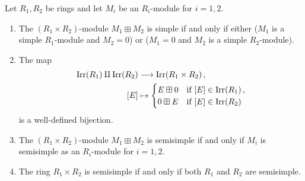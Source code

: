 \begin{proposition}
  \label{proposition: product of semisimple}
  Let $R_1, R_2$ be rings and let $M_i$ be an $R_i$-module for $i = 1, 2$.
  \begin{enumerate}
    \item
      \label{enumerate: when boxplus is simple}
      The $(R_1 \times R_2)$-module $M_1 \boxplus M_2$ is simple if and only if either ($M_1$ is a simple $R_1$-module and $M_2 = 0$) or ($M_1 = 0$ and $M_2$ is a simple $R_2$-module).
    \item
      The map
      \begin{align*}
                  \operatorname{Irr}(R_1) \amalg \operatorname{Irr}(R_2)
        &\longrightarrow  \operatorname{Irr}(R_1 \times R_2) \,,
        \\
                  [E]
        &\mapsto  \begin{cases}
                    E \boxplus 0  & \text{if $[E] \in \operatorname{Irr}(R_1)$} \,, \\
                    0 \boxplus E  & \text{if $[E] \in \operatorname{Irr}(R_2)$}
                  \end{cases}
      \end{align*}
      is a well-defined bijection.
    \item
      \label{enumerate: when boxplus is semisimple}
      The $(R_1 \times R_2)$-module $M_1 \boxplus M_2$ is semisimple if and only if $M_i$ is semisimple as an $R_i$-module for $i = 1, 2$.
    \item
      The ring $R_1 \times R_2$ is semisimple if and only if both $R_1$ and $R_2$ are semisimple.
  \end{enumerate}
\end{proposition}


